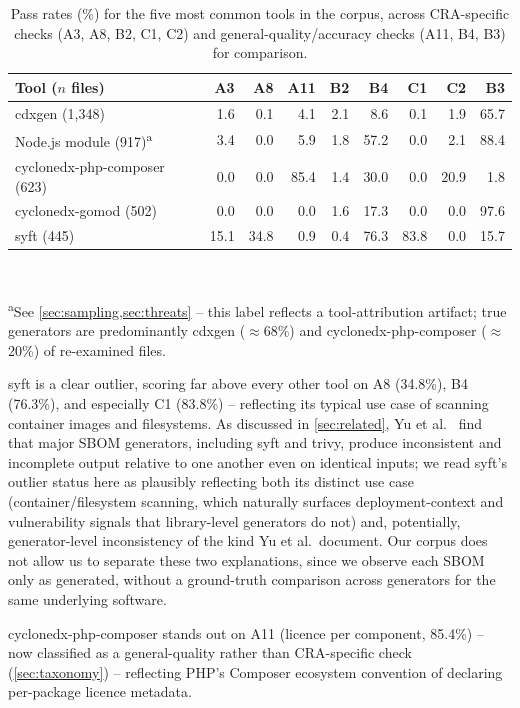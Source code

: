 \documentclass[11pt]{article}
\begin{document}
\begin{table}[t]
\centering
\caption{Pass rates (\%) for the five most common tools in the corpus, across CRA-specific checks (A3, A8, B2, C1, C2) and general-quality/accuracy checks (A11, B4, B3) for comparison.}
\label{tab:tool-breakdown}
\begin{tabular}{lrrrrrrrr}
\toprule
Tool ($n$ files) & A3 & A8 & A11 & B2 & B4 & C1 & C2 & B3 \\
\midrule
cdxgen (1,348) & 1.6 & 0.1 & 4.1 & 2.1 & 8.6 & 0.1 & 1.9 & 65.7 \\
Node.js module (917)\textsuperscript{a} & 3.4 & 0.0 & 5.9 & 1.8 & 57.2 & 0.0 & 2.1 & 88.4 \\
cyclonedx-php-composer (623) & 0.0 & 0.0 & 85.4 & 1.4 & 30.0 & 0.0 & 20.9 & 1.8 \\
cyclonedx-gomod (502) & 0.0 & 0.0 & 0.0 & 1.6 & 17.3 & 0.0 & 0.0 & 97.6 \\
syft (445) & 15.1 & 34.8 & 0.9 & 0.4 & 76.3 & 83.8 & 0.0 & 15.7 \\
\bottomrule
\end{tabular}
\\[2pt]
\raggedright\footnotesize\textsuperscript{a}See \cref{sec:sampling,sec:threats} -- this label reflects a tool-attribution artifact; true generators are predominantly cdxgen ($\approx$68\%) and cyclonedx-php-composer ($\approx$20\%) of re-examined files.
\end{table}

syft is a clear outlier, scoring far above every other tool on A8 (34.8\%), B4 (76.3\%), and especially C1 (83.8\%) -- reflecting its typical use case of scanning container images and filesystems. As discussed in \cref{sec:related}, Yu et al.\ \cite{yu2024} find that major SBOM generators, including syft and trivy, produce inconsistent and incomplete output relative to one another even on identical inputs; we read syft's outlier status here as plausibly reflecting both its distinct use case (container/filesystem scanning, which naturally surfaces deployment-context and vulnerability signals that library-level generators do not) and, potentially, generator-level inconsistency of the kind Yu et al.\ document. Our corpus does not allow us to separate these two explanations, since we observe each SBOM only as generated, without a ground-truth comparison across generators for the same underlying software.

cyclonedx-php-composer stands out on A11 (licence per component, 85.4\%) -- now classified as a general-quality rather than CRA-specific check (\cref{sec:taxonomy}) -- reflecting PHP's Composer ecosystem convention of declaring per-package licence metadata.
\end{document}
